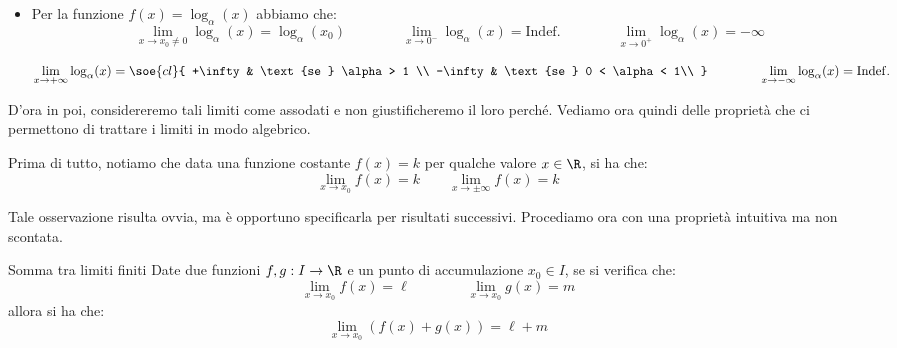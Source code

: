 \documentclass[a4paper, 12pt]{report}
\begin{document}
\begin{itemize}
        \item Per la funzione $f(x) = \log_\alpha(x)$ abbiamo che:
        \[\lim_{x \to x_0 \neq 0} \log_\alpha(x) =  \log_\alpha(x_0)
        \qquad\qquad
        \lim_{x \to 0^-} \log_\alpha(x) =  \mathrm{Indef.}
        \qquad\qquad
        \lim_{x \to 0^+} \log_\alpha(x) =  -\infty\]

        \[\lim_{x \to +\infty} \log_\alpha(x) = \soe{cl}{
            +\infty & \text{se } \alpha > 1 \\
            -\infty & \text{se } 0 < \alpha < 1\\
        }
        \qquad\qquad
        \lim_{x \to -\infty} \log_\alpha(x) = \mathrm{Indef.}\]
    \end{itemize}

    \newpage

    D'ora in poi, considereremo tali limiti come assodati e non giustificheremo il loro perché. Vediamo ora quindi delle proprietà che ci permettono di trattare i limiti in modo algebrico.

    Prima di tutto, notiamo che data una funzione costante $f(x) = k$ per qualche valore $x \in \R$, si ha che:
    \[\lim_{x \to x_0} f(x) = k \qquad \lim_{x \to \pm \infty} f(x) = k\]

    Tale osservazione risulta ovvia, ma è opportuno specificarla per risultati successivi. Procediamo ora con una proprietà intuitiva ma non scontata.

    \begin{framedprop}{Somma tra limiti finiti}
        Date due funzioni $f,g : I \to \R$ e un punto di accumulazione $x_0 \in I$, se si verifica che:
        \[\lim_{x \to x_0} f(x) = \ell \qquad\qquad \lim_{x \to x_0} g(x) = m\]
        allora si ha che:
        \[\lim_{x \to x_0} (f(x) + g(x)) = \ell + m\]
    \end{framedprop}

\end{document}

